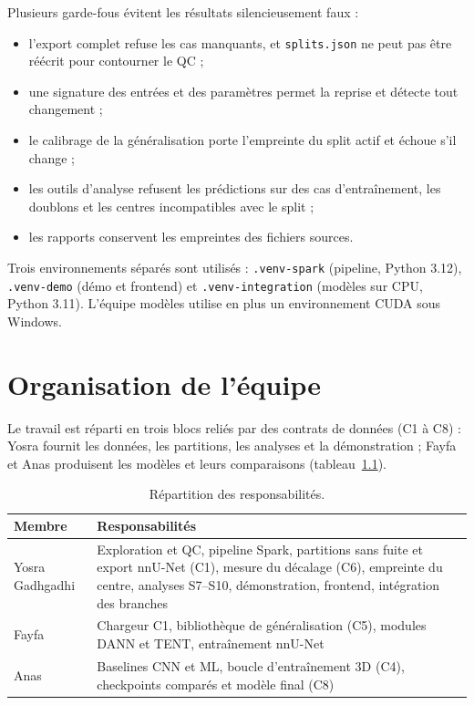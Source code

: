 \documentclass[11pt,a4paper]{report}
\newcommand{\fichier}[1]{\texttt{#1}}
\begin{document}
Plusieurs garde-fous évitent les résultats silencieusement faux :
\begin{itemize}
  \item l'export complet refuse les cas manquants, et \fichier{splits.json}
        ne peut pas être réécrit pour contourner le QC ;
  \item une signature des entrées et des paramètres permet la reprise et
        détecte tout changement ;
  \item le calibrage de la généralisation porte l'empreinte du split actif et
        échoue s'il change ;
  \item les outils d'analyse refusent les prédictions sur des cas
        d'entraînement, les doublons et les centres incompatibles avec le
        split ;
  \item les rapports conservent les empreintes des fichiers sources.
\end{itemize}

Trois environnements séparés sont utilisés : \fichier{.venv-spark} (pipeline,
Python 3.12), \fichier{.venv-demo} (démo et frontend) et
\fichier{.venv-integration} (modèles sur CPU, Python 3.11). L'équipe modèles
utilise en plus un environnement CUDA sous Windows.

\chapter{Organisation de l'équipe}

Le travail est réparti en trois blocs reliés par des contrats de données
(C1 à C8) : Yosra fournit les données, les partitions, les analyses et la
démonstration ; Fayfa et Anas produisent les modèles et leurs comparaisons
(tableau~\ref{tab:equipe}).

\begin{table}[H]
  \centering
  \caption{Répartition des responsabilités.}
  \label{tab:equipe}
  \begin{tabularx}{\textwidth}{lX}
    \toprule
    \textbf{Membre} & \textbf{Responsabilités} \\
    \midrule
    Yosra Gadhgadhi & Exploration et QC, pipeline Spark, partitions sans fuite
      et export nnU-Net (C1), mesure du décalage (C6), empreinte du centre,
      analyses S7--S10, démonstration, frontend, intégration des branches \\
    Fayfa & Chargeur C1, bibliothèque de généralisation (C5), modules DANN et
      TENT, entraînement nnU-Net \\
    Anas & Baselines CNN et ML, boucle d'entraînement 3D (C4), checkpoints
      comparés et modèle final (C8) \\
    \bottomrule
  \end{tabularx}
\end{table}
\end{document}
